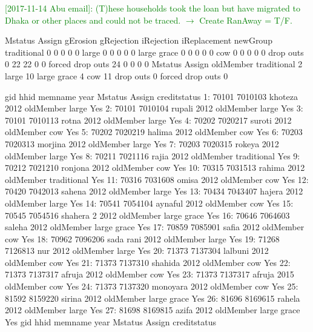 \textcolor{green}{[2017-11-14 Abu email]: (T)hese households took the loan but have migrated to Dhaka or other places and could not be traced. $\rightarrow$ Create \textsf{RanAway} = T/F.} 
\begin{Schunk}
\begin{Soutput}
                  Mstatus
Assign             gErosion gRejection iRejection iReplacement newGroup
  traditional             0          0          0            0        0
  large                   0          0          0            0        0
  large grace             0          0          0            0        0
  cow                     0          0          0            0        0
  drop outs               0         22         22            0        0
  forced drop outs       24          0          0            0        0
                  Mstatus
Assign             oldMember
  traditional              2
  large                   10
  large grace              4
  cow                     11
  drop outs                0
  forced drop outs         0
\end{Soutput}
\begin{Soutput}
      gid    hhid   memname year   Mstatus      Assign creditstatus
 1: 70101 7010103   khoteza 2012 oldMember       large          Yes
 2: 70101 7010104    rupali 2012 oldMember       large          Yes
 3: 70101 7010113     rotna 2012 oldMember       large          Yes
 4: 70202 7020217    suroti 2012 oldMember         cow          Yes
 5: 70202 7020219    halima 2012 oldMember         cow          Yes
 6: 70203 7020313   morjina 2012 oldMember       large          Yes
 7: 70203 7020315    rokeya 2012 oldMember       large          Yes
 8: 70211 7021116     rajia 2012 oldMember traditional          Yes
 9: 70212 7021210   ronjona 2012 oldMember         cow          Yes
10: 70315 7031513    rahima 2012 oldMember traditional          Yes
11: 70316 7031608     omisa 2012 oldMember         cow          Yes
12: 70420 7042013    sahena 2012 oldMember       large          Yes
13: 70434 7043407    hajera 2012 oldMember       large          Yes
14: 70541 7054104   aynaful 2012 oldMember         cow          Yes
15: 70545 7054516 shahera 2 2012 oldMember large grace          Yes
16: 70646 7064603    saleha 2012 oldMember large grace          Yes
17: 70859 7085901     safia 2012 oldMember         cow          Yes
18: 70962 7096206 sada rani 2012 oldMember       large          Yes
19: 71268 7126813       nur 2012 oldMember       large          Yes
20: 71373 7137304   lalbuni 2012 oldMember         cow          Yes
21: 71373 7137310   shahida 2012 oldMember         cow          Yes
22: 71373 7137317    afruja 2012 oldMember         cow          Yes
23: 71373 7137317    afruja 2015 oldMember         cow          Yes
24: 71373 7137320  monoyara 2012 oldMember         cow          Yes
25: 81592 8159220    sirina 2012 oldMember large grace          Yes
26: 81696 8169615    rahela 2012 oldMember       large          Yes
27: 81698 8169815     azifa 2012 oldMember large grace          Yes
      gid    hhid   memname year   Mstatus      Assign creditstatus
\end{Soutput}
\end{Schunk}

